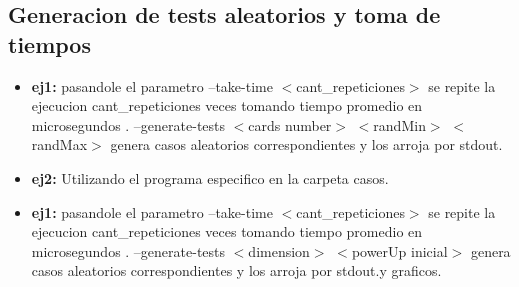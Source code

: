 \subsection{Generacion de tests aleatorios y toma de tiempos}
\begin{itemize}
	\item \textbf{ej1:} pasandole el parametro --take-time $<$cant\_repeticiones$>$ se repite la ejecucion cant\_repeticiones veces tomando tiempo promedio en microsegundos . --generate-tests $<$cards number$>$ $<$randMin$>$ $<$randMax$>$ genera casos aleatorios correspondientes y los arroja por stdout.
	\item \textbf{ej2:} Utilizando el programa especifico en la carpeta casos.
	\item \textbf{ej1:} pasandole el parametro --take-time $<$cant\_repeticiones$>$ se repite la ejecucion cant\_repeticiones veces tomando tiempo promedio en microsegundos . --generate-tests $<$dimension$>$ $<$powerUp inicial$>$ genera casos aleatorios correspondientes y los arroja por stdout.y graficos.
\end{itemize}